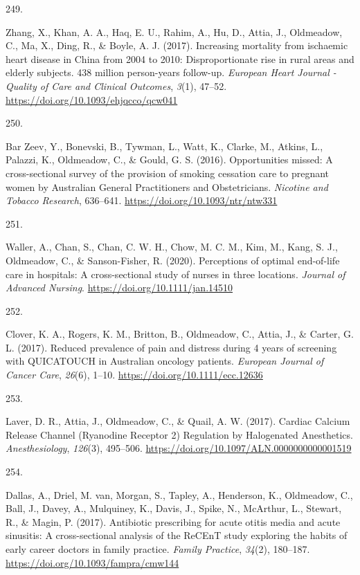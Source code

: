 \documentclass[11pt, a4paper]{awesome-cv}
\newlength{\csllabelwidth}
\newcommand{\CSLLeftMargin}[1]{\parbox[t]{\csllabelwidth}{#1}}
\newcommand{\CSLRightInline}[1]{\parbox[t]{\linewidth - \csllabelwidth}{#1}}
\begin{document}
\leavevmode\hypertarget{ref-zhang_increasing_2017}{}%
\CSLLeftMargin{249. }
\CSLRightInline{Zhang, X., Khan, A. A., Haq, E. U., Rahim, A., Hu, D.,
Attia, J., Oldmeadow, C., Ma, X., Ding, R., \& Boyle, A. J. (2017).
Increasing mortality from ischaemic heart disease in China from 2004 to
2010: Disproportionate rise in rural areas and elderly subjects. 438
million person-years follow-up. \emph{European Heart Journal - Quality
of Care and Clinical Outcomes}, \emph{3}(1), 47--52.
\url{https://doi.org/10.1093/ehjqcco/qcw041}}

\leavevmode\hypertarget{ref-bar_zeev_opportunities_2016}{}%
\CSLLeftMargin{250. }
\CSLRightInline{Bar Zeev, Y., Bonevski, B., Tywman, L., Watt, K.,
Clarke, M., Atkins, L., Palazzi, K., Oldmeadow, C., \& Gould, G. S.
(2016). Opportunities missed: A cross-sectional survey of the provision
of smoking cessation care to pregnant women by Australian General
Practitioners and Obstetricians. \emph{Nicotine and Tobacco Research},
636--641. \url{https://doi.org/10.1093/ntr/ntw331}}

\leavevmode\hypertarget{ref-waller_perceptions_2020}{}%
\CSLLeftMargin{251. }
\CSLRightInline{Waller, A., Chan, S., Chan, C. W. H., Chow, M. C. M.,
Kim, M., Kang, S. J., Oldmeadow, C., \& Sanson-Fisher, R. (2020).
Perceptions of optimal end-of-life care in hospitals: A cross-sectional
study of nurses in three locations. \emph{Journal of Advanced Nursing}.
\url{https://doi.org/10.1111/jan.14510}}

\leavevmode\hypertarget{ref-clover_reduced_2017}{}%
\CSLLeftMargin{252. }
\CSLRightInline{Clover, K. A., Rogers, K. M., Britton, B., Oldmeadow,
C., Attia, J., \& Carter, G. L. (2017). Reduced prevalence of pain and
distress during 4 years of screening with QUICATOUCH in Australian
oncology patients. \emph{European Journal of Cancer Care}, \emph{26}(6),
1--10. \url{https://doi.org/10.1111/ecc.12636}}

\leavevmode\hypertarget{ref-laver_cardiac_2017}{}%
\CSLLeftMargin{253. }
\CSLRightInline{Laver, D. R., Attia, J., Oldmeadow, C., \& Quail, A. W.
(2017). Cardiac Calcium Release Channel (Ryanodine Receptor 2)
Regulation by Halogenated Anesthetics. \emph{Anesthesiology},
\emph{126}(3), 495--506.
\url{https://doi.org/10.1097/ALN.0000000000001519}}

\leavevmode\hypertarget{ref-dallas_antibiotic_2017}{}%
\CSLLeftMargin{254. }
\CSLRightInline{Dallas, A., Driel, M. van, Morgan, S., Tapley, A.,
Henderson, K., Oldmeadow, C., Ball, J., Davey, A., Mulquiney, K., Davis,
J., Spike, N., McArthur, L., Stewart, R., \& Magin, P. (2017).
Antibiotic prescribing for acute otitis media and acute sinusitis: A
cross-sectional analysis of the ReCEnT study exploring the habits of
early career doctors in family practice. \emph{Family Practice},
\emph{34}(2), 180--187. \url{https://doi.org/10.1093/fampra/cmw144}}
\end{document}
